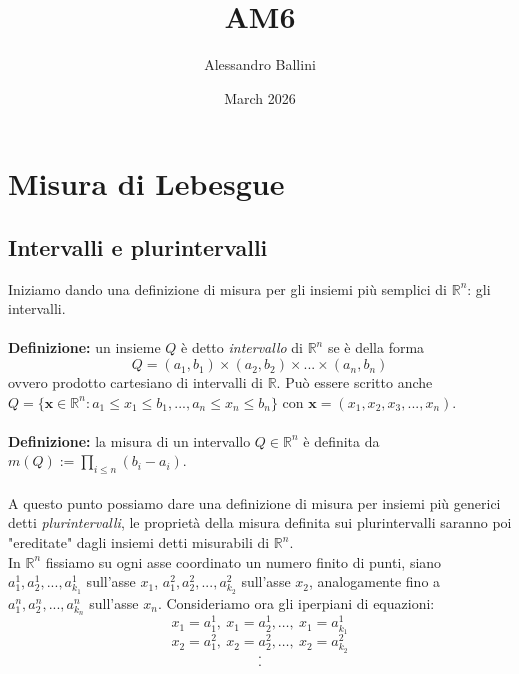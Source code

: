 \documentclass{article}
\title{AM6}
\author{Alessandro Ballini}
\date{March 2026}
\numberwithin{equation}{subsection}
\begin{document}
\maketitle
\tableofcontents
\newpage

\section{Misura di Lebesgue}
\subsection{Intervalli e plurintervalli}
Iniziamo dando una definizione di misura per gli insiemi più semplici di $\mathbb{R}^n$: gli intervalli.\\ \\
\textbf{Definizione:} un insieme $Q$ è detto \textit{intervallo} di $\mathbb{R}^n$ se è della forma
\begin{equation*}
    Q = (a_1,b_1) \times (a_2,b_2) \times ... \times (a_n, b_n) 
\end{equation*}
ovvero prodotto cartesiano di intervalli di $\mathbb{R}$. Può essere scritto anche $Q = \{ \mathbf{x} \in \mathbb{R}^n: a_1 \leq x_1 \leq b_1,..., a_n \leq x_n \leq b_n \}$ con $\mathbf{x} = (x_1,x_2,x_3,...,x_n)$.\\ \\
\textbf{Definizione:} la misura di un intervallo $Q \in \mathbb{R}^n$ è definita da $m(Q) := \prod_{i \leq n}(b_i - a_i)$.\\ \\
A questo punto possiamo dare una definizione di misura per insiemi più generici detti \textit{plurintervalli}, le proprietà della misura definita sui plurintervalli saranno poi "ereditate" dagli insiemi detti misurabili di $\mathbb{R}^n$.\\
In $\mathbb{R}^n$ fissiamo su ogni asse coordinato un numero finito di punti, siano $a^1_1, a^1_2, ... , a^1_{k_1}$ sull'asse $x_1$, $a^2_1, a^2_2, ... , a^2_{k_2}$ sull'asse $x_2$, analogamente fino a $a^n_1, a^n_2, ... , a^n_{k_n}$ sull'asse $x_n$. Consideriamo ora gli iperpiani di equazioni:
\begin{equation*}
    x_1 = a^1_1, \ x_1 = a^1_2, \dots , \ x_1 = a^1_{k_1} 
\end{equation*}
\begin{equation*}
    x_2 = a^2_1, \ x_2 = a^2_2, \dots , \ x_2 = a^2_{k_2} 
\end{equation*}
\begin{align*} 
    . \\ 
    . \\ 
\end{align*}
\end{document}
